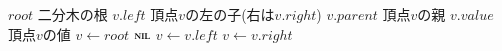 \documentclass[main]{subfiles}
\begin{document}
\begin{algorithm}[H]
\caption{$\Min(V)$}
\begin{algorithmic}[1]
\scriptsize
\Require
\Statex	$root$ 二分木の根
\Statex	$v.left$ 頂点$v$の左の子(右は$v.right$)
\Statex $v.parent$ 頂点$v$の親
\Statex $v.value$ 頂点$v$の値
	\State $v \gets root$
		\State \Return $\text{\textsc{nil}}$
	\EndIf
			\State $v \gets v.left$
		\Else
			\State $v \gets v.right$
		\EndIf
	\EndWhile
\EndFunction
		
\end{algorithmic}
\end{algorithm}
\end{document}
